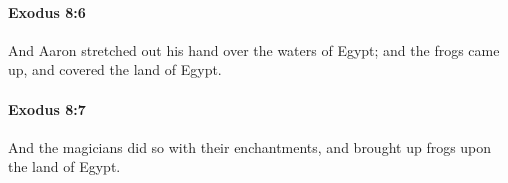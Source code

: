 		\paragraph{Exodus 8:6} %
			\label{EXODUS-8-6}

			And Aaron stretched out his hand over the waters of Egypt; and the frogs came up, and covered the land of Egypt.


		\paragraph{Exodus 8:7} %
			\label{EXODUS-8-7}

			And the magicians did so with their enchantments, and brought up frogs upon the land of Egypt.


